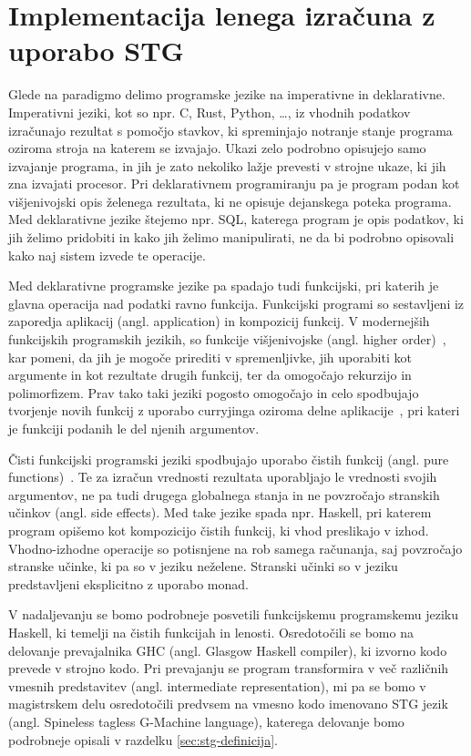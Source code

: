 \chapter{Implementacija lenega izračuna z uporabo STG}
\label{ch:stg}

Glede na paradigmo delimo programske jezike na imperativne in deklarativne. Imperativni jeziki, kot so npr. C, Rust, Python, \dots, iz vhodnih podatkov izračunajo rezultat s pomočjo stavkov, ki spreminjajo notranje stanje programa oziroma stroja na katerem se izvajajo. Ukazi zelo podrobno opisujejo samo izvajanje programa, in jih je zato nekoliko lažje prevesti v strojne ukaze, ki jih zna izvajati procesor. Pri deklarativnem programiranju pa je program podan kot višjenivojski opis želenega rezultata, ki ne opisuje dejanskega poteka programa. Med deklarativne jezike štejemo npr. SQL, katerega program je opis podatkov, ki jih želimo pridobiti in kako jih želimo manipulirati, ne da bi podrobno opisovali kako naj sistem izvede te operacije.

Med deklarativne programske jezike pa spadajo tudi funkcijski, pri katerih je glavna operacija nad podatki ravno funkcija. Funkcijski programi so sestavljeni iz zaporedja aplikacij (angl. application) in kompozicij funkcij. V modernejših funkcijskih programskih jezikih, so funkcije višjenivojske (angl. higher order)~\cite{hudak1989conception}, kar pomeni, da jih je mogoče prirediti v spremenljivke, jih uporabiti kot argumente in kot rezultate drugih funkcij, ter da omogočajo rekurzijo in polimorfizem. Prav tako taki jeziki pogosto omogočajo in celo spodbujajo tvorjenje novih funkcij z uporabo curryjinga oziroma delne aplikacije~\cite{hudak1989conception}, pri kateri je funkciji podanih le del njenih argumentov.

Čisti funkcijski programski jeziki spodbujajo uporabo čistih funkcij (angl. pure functions)~\cite{hudak1989conception}. Te za izračun vrednosti rezultata uporabljajo le vrednosti svojih argumentov, ne pa tudi drugega globalnega stanja in ne povzročajo stranskih učinkov (angl. side effects). Med take jezike spada npr. Haskell, pri katerem program opišemo kot kompozicijo čistih funkcij, ki vhod preslikajo v izhod. Vhodno-izhodne operacije so potisnjene na rob samega računanja, saj povzročajo stranske učinke, ki pa so v jeziku neželene. Stranski učinki so v jeziku predstavljeni eksplicitno z uporabo monad. 

V nadaljevanju se bomo podrobneje posvetili funkcijskemu programskemu jeziku Haskell, ki temelji na čistih funkcijah in lenosti. Osredotočili se bomo na delovanje prevajalnika GHC (angl. Glasgow Haskell compiler), ki izvorno kodo prevede v strojno kodo. Pri prevajanju se program transformira v več različnih vmesnih predstavitev (angl. intermediate representation), mi pa se bomo v magistrskem delu osredotočili predvsem na vmesno kodo imenovano STG jezik (angl. Spineless tagless G-Machine language), katerega delovanje bomo podrobneje opisali v razdelku \ref{sec:stg-definicija}.

